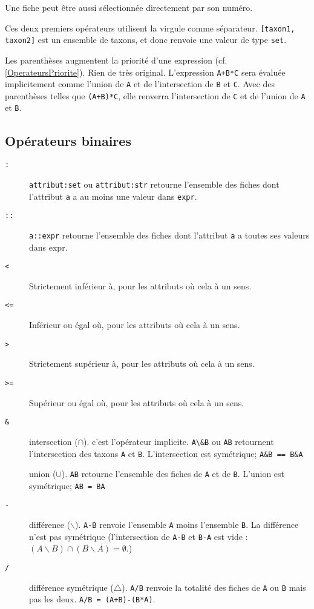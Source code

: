 \documentclass[11pt]{article}
\begin{document}
Une fiche peut être aussi sélectionnée directement par son numéro.

Ces deux premiers opérateurs utilisent la virgule comme séparateur.
\texttt{{[}taxon1, taxon2{]}} est un ensemble de taxons, et donc renvoie
une valeur de type \texttt{set}.

\begin{description}
\itemsep1pt\parskip0pt
\item[\texttt{()}]
Les parenthèses augmentent la priorité d'une expression (cf.
\vref{OperateursPriorite}). Rien de très original. L'expression
\texttt{A+B*C} sera évaluée implicitement comme l'union de \texttt{A} et
de l'intersection de \texttt{B} et \texttt{C}. Avec des parenthèses
telles que \texttt{(A+B)*C}, elle renverra l'intersection de \texttt{C}
et de l'union de \texttt{A} et \texttt{B}.
\end{description}

\subsection{Opérateurs binaires}\label{opuxe9rateurs-binaires}

\begin{description}
\item[\texttt{:}]
\texttt{attribut:set} ou \texttt{attribut:str} retourne l'ensemble des
fiches dont l'attribut \texttt{a} a au moins une valeur dans
\texttt{expr}.
\item[\texttt{::}]
\texttt{a::expr} retourne l'ensemble des fiches dont l'attribut
\texttt{a} a toutes ses valeurs dans expr.
\item[\texttt{\textless{}}]
Strictement inférieur à, pour les attributs où cela à un sens.
\item[\texttt{\textless{}=}]
Inférieur ou égal où, pour les attributs où cela à un sens.
\item[\texttt{\textgreater{}}]
Strictement supérieur à, pour les attributs où cela à un sens.
\item[\texttt{\textgreater{}=}]
Supérieur ou égal où, pour les attributs où cela à un sens.
\item[\texttt{\&}]
intersection ($\cap$). c'est l'opérateur implicite.
\texttt{A\textbackslash{}\&B} ou \texttt{AB} retournent l'intersection
des taxons \texttt{A} et \texttt{B}. L'intersection est symétrique;
\texttt{A\&B == B\&A}
\item[\texttt{\textbar{}}]
union ($\cup$). \texttt{A\textbar{}B} retourne l'ensemble des fiches de
\texttt{A} et de \texttt{B}. L'union est symétrique;
\texttt{A\textbar{}B = B\textbar{}A}
\item[\texttt{-}]
différence ($\backslash$). \texttt{A-B} renvoie l'ensemble \texttt{A}
moins l'ensemble \texttt{B}. La différence n'est pas symétrique
(l'intersection de \texttt{A-B} et \texttt{B-A} est vide :
$(A\backslash B)\cap(B\backslash A)=\emptyset$.)
\item[\texttt{/}]
différence symétrique ($\bigtriangleup$). \texttt{A/B} renvoie la
totalité des fiches de \texttt{A} ou \texttt{B} mais pas les deux.
\texttt{A/B = (A+B)-(B*A)}.
\end{description}
\end{document}
